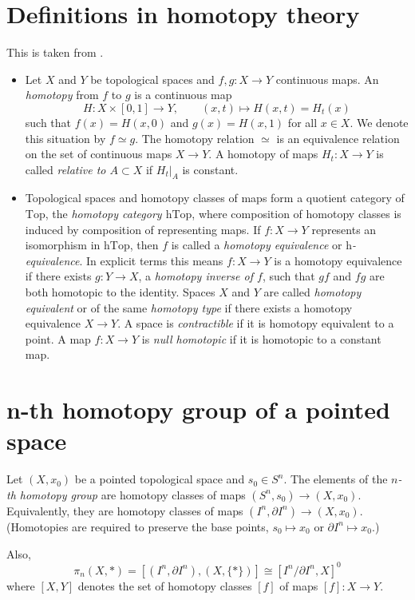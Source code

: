 \section{Definitions in homotopy theory}
\label{section-defin-homot-theor}

This is taken from \cite{TomDieck}.

\begin{itemize}
\item Let $X$ and $Y$ be topological spaces
and
 $f,g:X\to Y$ continuous maps.
An {\it homotopy} from $f$ to $g$ is a
continuous map
$$
H:X\times[0,1]\to Y,\qquad(x,t)\mapsto
H(x,t)=H_t(x)
$$
\noindent
such that $f(x)=H(x,0)$ and $g(x)=H(x,1)$ for
all $x\in X$.
We denote this situation by $f\simeq g$.
The homotopy relation $\simeq$ is an
equivalence relation
on the set of continuous maps $X\to Y$.
A homotopy of maps $H_t:X\to Y$ is called
{\it relative to $A\subset X$} if $H_t|_A$ is
constant.


\item Topological spaces and homotopy classes
of maps form a quotient category
of $\text{Top}$, the {\it homotopy category
$\text{hTop}$}, where composition
of homotopy classes is induced by composition
of representing maps. If $f:X\to
Y$ represents an isomorphism in
$\text{hTop}$, then $f$ is called a
{\it homotopy equivalence} or
{\it $\text{h}$-equivalence}. In explicit
terms this means $f:X\to
Y$ is a homotopy equivalence if there exists
$g:Y\to X$, a
{\it homotopy inverse of $f$}, such that $gf$
and $fg$ are both
homotopic to the identity. Spaces $X$ and $Y$
are called
{\it homotopy equivalent} or of the same {\it
homotopy
type} if there exists a homotopy equivalence
$X\to Y$. A space is
{\it contractible} if it is homotopy
equivalent to a point. A map
$f:X\to Y$ is {\it null homotopic} if it is
homotopic to a constant
map.

\end{itemize}

\section{n-th homotopy
group of a pointed space}
\label{section-n-th-homot-group-point-spac}

\begin{definition}
\label{definition-homotopy-group}
Let $(X,x_0)$ be a pointed topological space
and $s_0\in S^n$. The elements of
the {\it $n$-th homotopy group} are homotopy
classes of maps
$(S^n,s_0)\to (X,x_0)$. Equivalently, they
are homotopy classes of maps
$(I^n,\partial I^n)\to (X,x_0)$. (Homotopies
are required to preserve the base
points, $s_0\mapsto x_0$ or $\partial
I^n\mapsto x_0$.)

Also,
$$
\pi_n(X,*)=[(I^n,\partial
I^n),(X,\{*\})]\cong[I^n/\partial I^n,X]^0
$$
where $[X,Y]$ denotes the set of homotopy
classes $[f]$ of maps $[f]:X\to Y$.
\end{definition}

